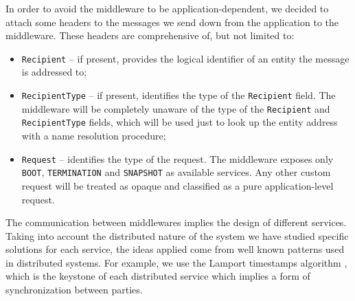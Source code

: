 In order to avoid the middleware to be application-dependent, we decided to
attach some headers to the messages we send down from the application to the
middleware.
These headers are comprehensive of, but not limited to:
\begin{itemize}
  \item \texttt{Recipient} -- if present, provides the logical identifier of an
    entity the message is addressed to;
  \item \texttt{RecipientType} -- if present, identifies the type of the
    \texttt{Recipient} field. The middleware will be completely unaware
    of the type of the \texttt{Recipient} and \texttt{RecipientType} fields,
    which will be used just to look up the entity address with a name
    resolution procedure;
  \item \texttt{Request} -- identifies the type of the request. The middleware
    exposes only \texttt{BOOT}, \texttt{TERMINATION} and \texttt{SNAPSHOT} as
    available services. Any other custom request will be treated as opaque and
    classified as a pure application-level request.
\end{itemize}


The communication between middlewares implies the design of different
services. Taking into account the distributed nature of the system we have
studied specific solutions for each service, the ideas applied come from
well known patterns used in distributed systems.
For example, we use the Lamport timestamps algorithm \cite{Lamport:1978:TCO:359545.359563},
which is the keystone
of each distributed service which implies a form of synchronization
between parties.




